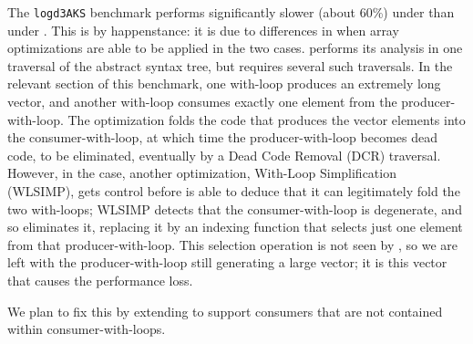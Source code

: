 The {\tt logd3AKS} benchmark performs significantly
slower (about 60\%) under \awlf than under \wlf. 
This is by happenstance: it is due to differences in when 
array optimizations are able to be applied in the two cases.
\wlf performs its analysis
in one traversal of the abstract syntax tree, but \awlf requires
several such traversals. In the relevant section of
this benchmark, one with-loop
produces an extremely long vector, and another with-loop
consumes exactly one element from the producer-with-loop.
The \wlf optimization folds the code that produces the
vector elements into the consumer-with-loop, at which time
the producer-with-loop becomes dead code, to be
eliminated, eventually by a Dead Code Removal (DCR)
traversal. However, in the \awlf case, another optimization,
With-Loop Simplification (WLSIMP), gets control before
\awlf is able to deduce that it can legitimately
fold the two with-loops; WLSIMP detects
that the consumer-with-loop is degenerate, and so eliminates
it, replacing it by an indexing function that selects
just one element from that producer-with-loop. This selection
operation is not seen by \awlf, so we are left with
the producer-with-loop still generating a large vector;
it is this vector that causes the performance loss.

We plan to fix this by extending \awlf to support consumers that 
are not contained within consumer-with-loops.

